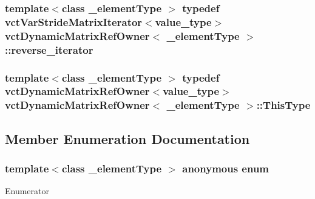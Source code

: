 \hypertarget{classvct_dynamic_matrix_ref_owner_a133b22e9f6b4e7a20998ad3db72ed6c3}{
\subsubsection[{reverse\-\_\-iterator}]{\setlength{\rightskip}{0pt plus 5cm}template$<$class \-\_\-element\-Type $>$ typedef {\bf vct\-Var\-Stride\-Matrix\-Iterator}$<$value\-\_\-type$>$ {\bf vct\-Dynamic\-Matrix\-Ref\-Owner}$<$ \-\_\-element\-Type $>$\-::{\bf reverse\-\_\-iterator}}}\label{classvct_dynamic_matrix_ref_owner_a133b22e9f6b4e7a20998ad3db72ed6c3}
\hypertarget{classvct_dynamic_matrix_ref_owner_a004c89da7faff7d573988fc3b9ec43d9}{
\subsubsection[{This\-Type}]{\setlength{\rightskip}{0pt plus 5cm}template$<$class \-\_\-element\-Type $>$ typedef {\bf vct\-Dynamic\-Matrix\-Ref\-Owner}$<$value\-\_\-type$>$ {\bf vct\-Dynamic\-Matrix\-Ref\-Owner}$<$ \-\_\-element\-Type $>$\-::{\bf This\-Type}}}\label{classvct_dynamic_matrix_ref_owner_a004c89da7faff7d573988fc3b9ec43d9}


\subsection{Member Enumeration Documentation}
\hypertarget{classvct_dynamic_matrix_ref_owner_af13d59ea37e2deaafd66ed04d22db916}{\subsubsection[{anonymous enum}]{\setlength{\rightskip}{0pt plus 5cm}template$<$class \-\_\-element\-Type $>$ anonymous enum}}\label{classvct_dynamic_matrix_ref_owner_af13d59ea37e2deaafd66ed04d22db916}
\begin{Desc}
\item[Enumerator]\par
\begin{description}
\item[{\em 
\hypertarget{classvct_dynamic_matrix_ref_owner_af13d59ea37e2deaafd66ed04d22db916ae19d71a7e9eb96879fbbe0b8acea6fae}{D\-I\-M\-E\-N\-S\-I\-O\-N}\label{classvct_dynamic_matrix_ref_owner_af13d59ea37e2deaafd66ed04d22db916ae19d71a7e9eb96879fbbe0b8acea6fae}
}]\end{description}
\end{Desc}


